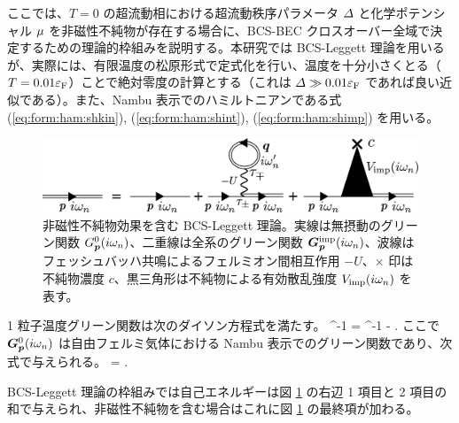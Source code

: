 
ここでは、$T=0$ の超流動相における超流動秩序パラメータ $\varDelta$ と化学ポテンシャル $\mu$ を非磁性不純物が存在する場合に、BCS-BEC クロスオーバー全域で決定するための理論的枠組みを説明する。本研究では BCS-Leggett 理論を用いるが、実際には、有限温度の松原形式で定式化を行い、温度を十分小さくとる（$T=0.01\varepsilon_{\text{F}}$）ことで絶対零度の計算とする（これは $\varDelta \gg 0.01\varepsilon_{\text{F}}$ であれば良い近似である）。また、Nambu 表示でのハミルトニアンである式 (\ref{eq:form:ham:shkin}), (\ref{eq:form:ham:shint}), (\ref{eq:form:ham:shimp}) を用いる。

\begin{figure}[t]
\begin{center}
\includegraphics[width=125mm]{eps/dyson-vimp.eps}
\end{center}
\caption{非磁性不純物効果を含む BCS-Leggett 理論。実線は無摂動のグリーン関数 $G^{0}_{\bm{p}}(i\omega_n)$、二重線は全系のグリーン関数 $\bm{G}^{\text{imp}}_{\bm{p}}(i\omega_n)$、波線はフェッシュバッハ共鳴によるフェルミオン間相互作用 $-U$、$\times$ 印は不純物濃度 $c$、黒三角形は不純物による有効散乱強度 $V_{\text{imp}} (i\omega_n)$ を表す。}
\label{fig:form:mnf:sigimp}
\end{figure}

 1 粒子温度グリーン関数は次のダイソン方程式を満たす。
 \beq
\left[ \bgimppom \right]^{-1} = \bgzrpom^{-1} - \bsigpom.\label{eq:form:mnf:dyson0}
\eeq
ここで $\bm{G}^{0}_{\bm{p}}(i\omega_n)$ は自由フェルミ気体における Nambu 表示でのグリーン関数であり、次式で与えられる。
\beq
\bgzrpom = .
\eeq

BCS-Leggett 理論の枠組みでは自己エネルギーは図 \ref{fig:form:mnf:sigimp} の右辺 1 項目と 2 項目の和で与えられ、非磁性不純物を含む場合はこれに図 \ref{fig:form:mnf:sigimp}  の最終項が加わる。

